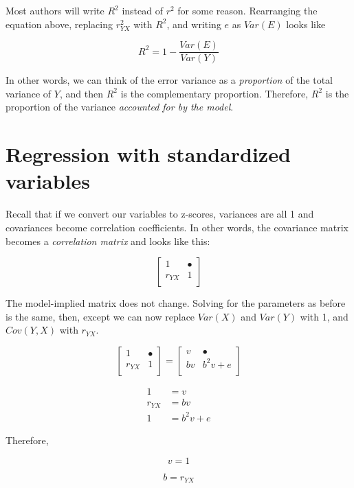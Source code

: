\documentclass[
]{book}
\begin{document}
Most authors will write \(R^{2}\) instead of \(r^{2}\) for some reason. Rearranging the equation above, replacing \(r_{YX}^{2}\) with \(R^{2}\), and writing \(e\) as \(Var(E)\) looks like

\[
R^{2} = 1 - \frac{Var(E)}{Var(Y)}
\]

In other words, we can think of the error variance as a \emph{proportion} of the total variance of \(Y\), and then \(R^2\) is the complementary proportion. Therefore, \(R^{2}\) is the proportion of the variance \emph{accounted for by the model}.

\hypertarget{simple-standardized}{%
\section{Regression with standardized variables}\label{simple-standardized}}

Recall that if we convert our variables to z-scores, variances are all 1 and covariances become correlation coefficients. In other words, the covariance matrix becomes a \emph{correlation matrix} and looks like this:

\[
\begin{bmatrix}
1       &    \bullet \\
r_{YX}  &    1       \\
\end{bmatrix}
\]

The model-implied matrix does not change. Solving for the parameters as before is the same, then, except we can now replace \(Var(X)\) and \(Var(Y)\) with 1, and \(Cov(Y, X)\) with \(r_{YX}\).

\[
\begin{bmatrix}
1       &    \bullet  \\
r_{YX}  &    1        \\
\end{bmatrix} =
\begin{bmatrix}
v    &    \bullet         \\
bv   &    b^{2}v + e \\
\end{bmatrix}
\]

\begin{align}
1 &= v \\
r_{YX} &= bv \\
1 &= b^2v + e
\end{align}

Therefore,

\[
v = 1
\]

\[
b = r_{YX}
\]
\end{document}
